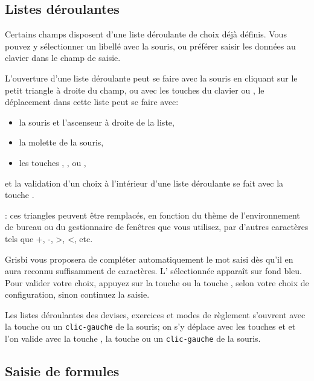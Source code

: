 \subsection{Listes déroulantes\label{transactions-new-lists}}

Certains champs disposent d'une liste déroulante de choix déjà définis. Vous pouvez y sélectionner un libellé avec la souris, ou préférer saisir les données au clavier dans le champ de saisie.

L'ouverture d'une liste déroulante peut se faire avec la souris en cliquant sur le petit triangle à droite du champ, ou avec les touches du clavier  ou \keys{\arrowkeydown}, le déplacement dans cette liste peut se faire avec:
\begin{itemize}
	\item la souris et l'ascenseur à droite de la liste,
	\item la molette de la souris,
	\item les touches , , \keys{\arrowkeyup} ou \keys{\arrowkeydown},
\end{itemize}
et la validation d'un choix à l'intérieur d'une liste déroulante se fait avec la touche .

\Note{}: ces triangles peuvent être remplacés, en fonction du thème de l'environnement de bureau ou du gestionnaire de fenêtres que vous utilisez, par d'autres caractères tels que +, -, >, <, etc.

Grisbi vous proposera de compléter automatiquement le mot saisi dès qu'il en aura reconnu suffisamment de caractères. L' sélectionnée apparaît sur \colorbox[RGB]{61,174,233}{fond bleu}. Pour valider votre choix, appuyez sur la touche  ou la touche , selon votre choix de configuration, sinon continuez la saisie.

Les listes déroulantes des devises, exercices et modes de règlement s'ouvrent avec la touche  ou un \texttt{clic-gauche} de la souris; on s'y déplace avec les touches \keys{\arrowkeyup} et \keys{\arrowkeydown} et l'on valide avec la touche , la touche  ou un \texttt{clic-gauche} de la souris.


\subsection{Saisie de formules\label{transactions-new-numbers}}

